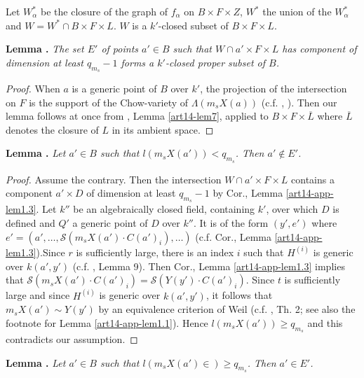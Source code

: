 Let $W^{*}_{\alpha}$ be the closure of the graph of $f_{\alpha}$ on $B\times F\times Z$, $W^{*}$ the union of the $W^{*}_{\alpha}$ and $W=W^{*}\cap B\times F\times L$. $W$ is a $k'$-closed subset of $B\times F\times L$.

\medskip
\noindent
{\bf Lemma .\label{art14-app-lem1.4}}
{\em The set $E'$ of points $a'\in B$ such that $W\cap a'\times F\times L$ has component of dimension at least $q_{m_{s}}-1$ forms a $k'$-closed proper subset of $B$.}

\begin{proof}
When $a$ is a generic point of $B$ over $k'$, the projection of the intersection on $F$ is the support of the Chow-variety of $\Lambda(m_{s}X(a))$ (c.f. \cite{art14-key14}, \cite{art14-key26}). Then our lemma follows at once from \cite{art14-key27}, Lemma \ref{art14-lem7}, applied to $B\times F\times \overline{L}$ where $\overline{L}$ denotes the closure of $L$ in its ambient space.
\end{proof}

\medskip
\noindent
{\bf Lemma .\label{art14-app-lem1.5}}
{\em Let $a'\in B$ such that $l(m_{s}X(a'))<q_{m_{s}}$. Then $a'\not\in E'$.}

\begin{proof}
Assume the contrary. Then the intersection $W\cap a'\times F\times L$ contains a component $a'\times D$ of dimension at least $q_{m_{s}}-1$ by Cor., Lemma \ref{art14-app-lem1.3}. Let $k''$ be an algebraically closed field, containing $k'$, over which $D$ is defined and $Q'$ a generic point of $D$ over $k''$. It is of the form $(y',e')$ where $e'=(a',\ldots,\mathscr{S}(m_{s}X(a')\cdot C(a')_{i}),\ldots)$ (c.f. Cor., Lemma \ref{art14-app-lem1.3}).\pageoriginale Since $r$ is sufficiently large, there is an index $i$ such that $H^{(i)}$ is generic over $k(a',y')$ (c.f. \cite{art14-key26}, Lemma 9). Then Cor., Lemma \ref{art14-app-lem1.3} implies that $\mathscr{S}(m_{s}X(a')\cdot C(a')_{i})=\mathscr{S}(Y(y')\cdot C(a')_{i})$. Since $t$ is sufficiently large and since $H^{(i)}$ is generic over $k(a',y')$, it follows that $m_{s}X(a')\sim Y(y')$ by an equivalence criterion of Weil (c.f. \cite{art14-key27}, Th. 2; see also the footnote for Lemma \ref{art14-app-lem1.1}). Hence $l(m_{s}X(a'))\geq q_{m_{s}}$ and this contradicts our assumption.
\end{proof}

\eject

\noindent
{\bf Lemma .\label{art14-app-lem1.6}}
{\em Let $a'\in B$ such that $l(m_{s}X(a')\in)\geq q_{m_{s}}$. Then $a'\in E'$.}

